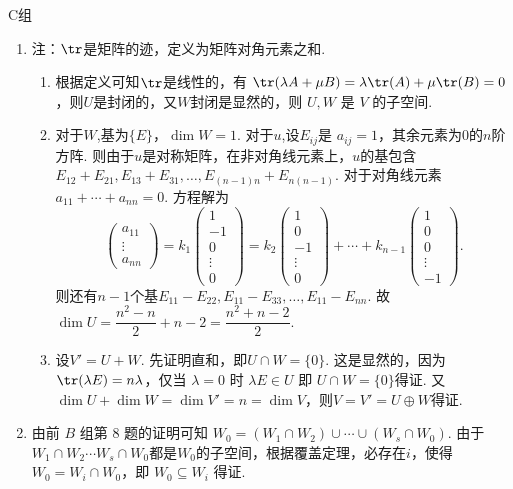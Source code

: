 \centerline{\heiti C组}
\begin{enumerate}
    \item 注：$\tr$是矩阵的迹，定义为矩阵对角元素之和.
          \begin{enumerate}
              \item 根据定义可知$\tr$是线性的，有 $\tr(\lambda A+\mu B)=\lambda\tr(A)+\mu\tr(B)=0$，则$U$是封闭的，又$W$封闭是显然的，则 $U,W$ 是 $V$ 的子空间.

              \item 对于$W$,基为$\{E\}$，$\dim W=1$. 对于$u$,设$E_{ij}$是 $a_{ij}=1$，其余元素为0的$n$阶方阵. 则由于$u$是对称矩阵，在非对角线元素上，$u$的基包含$E_{12}+E_{21},E_{13}+E_{31},\ldots ,E_{(n-1)n}+E_{n(n-1)}$. 对于对角线元素 $a_{11}+\cdots +a_{nn}=0$. 方程解为
                    \[\begin{pmatrix}a_{11}\\ \vdots\\ a_{nn}	\end{pmatrix}=k_1\begin{pmatrix}1 \\ -1 \\ 0\\ \vdots \\0	\end{pmatrix}=k_2\begin{pmatrix}1 \\ 0 \\ -1\\ \vdots \\0	\end{pmatrix}+\cdots+k_{n-1}\begin{pmatrix}1 \\ 0 \\ 0\\ \vdots \\-1	\end{pmatrix}.\]
                    则还有$n-1$个基$E_{11}-E_{22},E_{11}-E_{33},\ldots ,E_{11}-E_{nn}$. 故 $\dim U=\dfrac{n^2-n}2+n-2=\dfrac{n^2+n-2}2$.

              \item 设$V'=U+W$. 先证明直和，即$U\cap W=\{0\}$. 这是显然的，因为$\tr(\lambda E)=n\lambda$，仅当 $\lambda=0$ 时 $\lambda E\in U$ 即 $U\cap W=\{0\}$得证. 又$\dim U+\dim W=\dim V'=n=\dim V$，则$V=V'=U\oplus W$得证.
          \end{enumerate}

    \item 由前 $B$ 组第 8 题的证明可知 $W_0=(W_1\cap W_2)\cup\cdots\cup(W_s\cap W_0)$. 由于$W_1\cap W_2\cdots W_s\cap W_0$都是$W_0$的子空间，根据覆盖定理，必存在$i$，使得$W_0=W_i\cap W_0$，即 $W_0\subseteq W_i$ 得证.
\end{enumerate}

\clearpage
